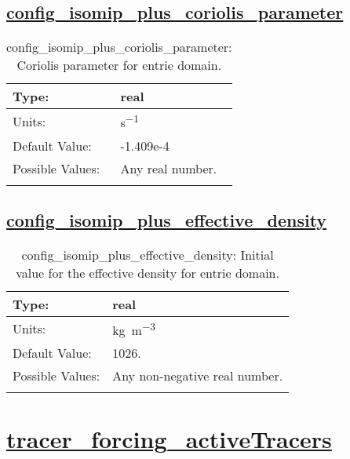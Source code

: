 \subsection[config\_isomip\_plus\_coriolis\_parameter]{\hyperref[sec:nm_tab_isomip_plus]{config\_isomip\_plus\_coriolis\_parameter}}
\label{subsec:nm_sec_config_isomip_plus_coriolis_parameter}
\begin{center}
\begin{longtable}{| p{2.0in} || p{4.0in} |}
    \hline
    Type: & real \\
    \hline
    Units: & \si{s^{-1}} \\
    \hline
    Default Value: & -1.409e-4 \\
    \hline
    Possible Values: & Any real number. \\
    \hline
    \caption{config\_isomip\_plus\_coriolis\_parameter: Coriolis parameter for entrie domain.}
\end{longtable}
\end{center}
\subsection[config\_isomip\_plus\_effective\_density]{\hyperref[sec:nm_tab_isomip_plus]{config\_isomip\_plus\_effective\_density}}
\label{subsec:nm_sec_config_isomip_plus_effective_density}
\begin{center}
\begin{longtable}{| p{2.0in} || p{4.0in} |}
    \hline
    Type: & real \\
    \hline
    Units: & \si{kg.m^{-3}} \\
    \hline
    Default Value: & 1026. \\
    \hline
    Possible Values: & Any non-negative real number. \\
    \hline
    \caption{config\_isomip\_plus\_effective\_density: Initial value for the effective density for entrie domain.}
\end{longtable}
\end{center}
\section[tracer\_forcing\_activeTracers]{\hyperref[sec:nm_tab_tracer_forcing_activeTracers]{tracer\_forcing\_activeTracers}}
\label{sec:nm_sec_tracer_forcing_activeTracers}
